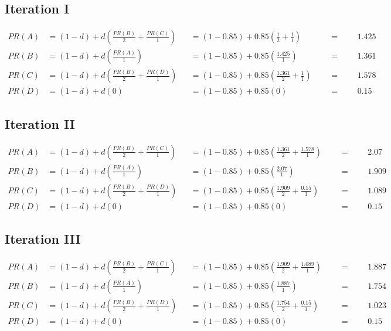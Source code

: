 \documentclass[a4paper,11pt]{article}
\begin{document}
\subsection{Iteration I}
\begin{align*}
    PR(A) &= (1-d) + d \left(\frac{PR(B)}{2} + \frac{PR(C)}{1}\right) &&= (1-0.85) + 0.85 \left(\frac{1}{2} + \frac{1}{1} \right) &&&=&&& 1.425\\
    PR(B) &= (1-d) + d \left(\frac{PR(A)}{1} \right) &&= (1-0.85) + 0.85 \left(\frac{1.425}{1} \right) &&&=&&& 1.361\\
    PR(C) &= (1-d) + d \left(\frac{PR(B)}{2} + \frac{PR(D)}{1} \right) &&= (1-0.85) + 0.85 \left(\frac{1.361}{2} + \frac{1}{1} \right) &&&=&&& 1.578 \\
    PR(D) &= (1-d) + d\left(0 \right) &&= (1-0.85) + 0.85 \left(0 \right) &&&=&&& 0.15 
\end{align*}
\subsection{Iteration II}
\begin{align*}
    PR(A) &= (1-d) + d \left(\frac{PR(B)}{2} + \frac{PR(C)}{1}\right) &&= (1-0.85) + 0.85 \left(\frac{1.361}{2} + \frac{1.578}{1} \right) &&&=&&& 2.07\\
    PR(B) &= (1-d) + d \left(\frac{PR(A)}{1} \right) &&= (1-0.85) + 0.85 \left(\frac{2.07}{1} \right) &&&=&&& 1.909\\
    PR(C) &= (1-d) + d \left(\frac{PR(B)}{2} + \frac{PR(D)}{1} \right) &&= (1-0.85) + 0.85 \left(\frac{1.909}{2} + \frac{0.15}{1} \right) &&&=&&& 1.089 \\
    PR(D) &= (1-d) + d\left(0 \right) &&= (1-0.85) + 0.85 \left(0 \right) &&&=&&& 0.15 
\end{align*}
\subsection{Iteration III}
\begin{align*}
    PR(A) &= (1-d) + d \left(\frac{PR(B)}{2} + \frac{PR(C)}{1}\right) &&= (1-0.85) + 0.85 \left(\frac{1.909}{2} + \frac{1.089}{1} \right) &&&=&&& 1.887\\
    PR(B) &= (1-d) + d \left(\frac{PR(A)}{1} \right) &&= (1-0.85) + 0.85 \left(\frac{1.887}{1} \right) &&&=&&& 1.754\\
    PR(C) &= (1-d) + d \left(\frac{PR(B)}{2} + \frac{PR(D)}{1} \right) &&= (1-0.85) + 0.85 \left(\frac{1.754}{2} + \frac{0.15}{1} \right) &&&=&&& 1.023 \\
    PR(D) &= (1-d) + d\left(0 \right) &&= (1-0.85) + 0.85 \left(0 \right) &&&=&&& 0.15 
\end{align*}
\end{document}
